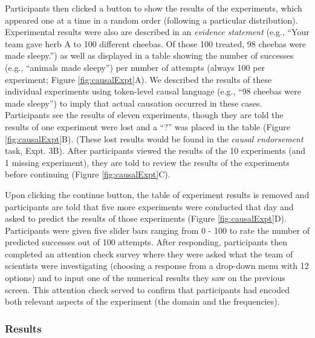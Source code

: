 \documentclass[english,,man,floatsintext]{apa6}
\theoremstyle{definition}
\theoremstyle{definition}
\theoremstyle{definition}
\theoremstyle{remark}
\begin{document}
Participants then clicked a button to show the results of the
experiments, which appeared one at a time in a random order (following a
particular distribution). Experimental results were also are described
in an \emph{evidence statement} (e.g., \enquote{Your team gave herb A to
100 different cheebas. Of those 100 treated, 98 cheebas were made
sleepy.}) as well as displayed in a table showing the number of
successes (e.g., \enquote{animals made sleepy}) per number of attempts
(always 100 per experiment; Figure \ref{fig:causalExpt}A). We described
the results of these individual experiments using token-level causal
language (e.g., \enquote{98 cheebas were made sleepy}) to imply that
actual causation occurred in these cases. Participants see the results
of eleven experiments, though they are told the results of one
experiment were lost and a \enquote{?} was placed in the table (Figure
\ref{fig:causalExpt}B). (These lost results would be found in the
\emph{causal endorsement} task, Expt. 3B). After participants viewed the
results of the 10 experiments (and 1 missing experiment), they are told
to review the results of the experiments before continuing (Figure
\ref{fig:causalExpt}C).

Upon clicking the continue button, the table of experiment results is
removed and participants are told that five more experiments were
conducted that day and asked to predict the results of those experiments
(Figure \ref{fig:causalExpt}D). Participants were given five slider bars
ranging from 0 - 100 to rate the number of predicted successes out of
100 attempts. After responding, participants then completed an attention
check survey where they were asked what the team of scientists were
investigating (choosing a response from a drop-down menu with 12
options) and to input one of the numerical results they saw on the
previous screen. This attention check served to confirm that
participants had encoded both relevant aspects of the experiment (the
domain and the frequencies).

\hypertarget{results-2}{%
\subsubsection{Results}\label{results-2}}
\end{document}
